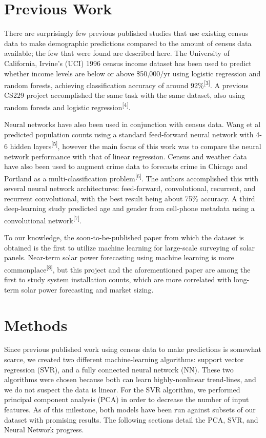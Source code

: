 \documentclass{article}
\begin{document}
	
	\section{Previous Work}
	\label{previous_work}
	
	There are surprisingly few previous published studies that use existing census data to make demographic predictions compared to the amount of census data available; the few that were found are described here. The University of California, Irvine’s (UCI) 1996 census income dataset has been used to predict whether income levels are below or above \$50,000/yr using logistic regression and random forests, achieving classification accuracy of around 92\%\textsuperscript{[3]}. A previous CS229 project accomplished the same task with the same dataset, also using random forests and logistic regression\textsuperscript{[4]}.
	
	Neural networks have also been used in conjunction with census data. Wang et al predicted population counts using a standard feed-forward neural network with 4-6 hidden layers\textsuperscript{[5]}, however the main focus of this work was to compare the neural network performance with that of linear regression. Census and weather data have also been used to augment crime data to forecasts crime in Chicago and Portland as a multi-classification problem\textsuperscript{[6]}. The authors accomplished this with several neural network architectures: feed-forward, convolutional, recurrent, and recurrent convolutional, with the best result being about 75\% accuracy. A third deep-learning study predicted age and gender from cell-phone metadata using a convolutional network\textsuperscript{[7]}. 
	
	To our knowledge, the soon-to-be-published paper from which the dataset is obtained is the first to utilize machine learning for large-scale surveying of solar panels. Near-term solar power forecasting using machine learning is more commonplace\textsuperscript{[8]}, but this project and the aforementioned paper are among the first to study system installation counts, which are more correlated with long-term solar power forecasting and market sizing.
	
	
	\section{Methods}
	
	Since previous published work using census data to make predictions is somewhat scarce, we created two different machine-learning algorithms: support vector regression (SVR), and a fully connected neural network (NN). These two algorithms were chosen because both can learn highly-nonlinear trend-lines, and we do not suspect the data is linear. For the SVR algorithm, we performed principal component analysis (PCA) in order to decrease the number of input features. As of this milestone, both models have been run against subsets of our dataset with promising results. The following sections detail the PCA, SVR, and Neural Network progress.
	
\end{document}

